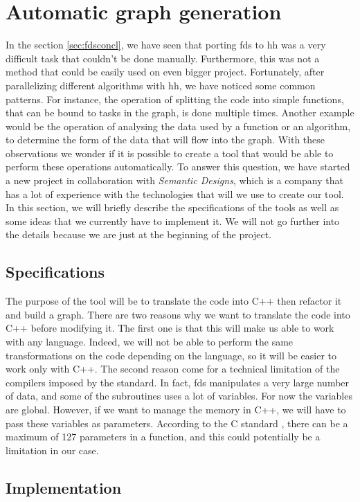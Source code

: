 
\section{Automatic graph generation}

In the section \ref{sec:fdsconcl}, we have seen that porting \gls{fds} to
\gls{hh} was a very difficult task that couldn't be done manually. Furthermore,
this was not a method that could be easily used on even bigger project.
Fortunately, after parallelizing different algorithms with \gls{hh}, we have
noticed some common patterns. For instance, the operation of splitting the code
into simple functions, that can be bound to tasks in the graph, is done multiple
times. Another example would be the operation of analysing the data used by a
function or an algorithm, to determine the form of the data that will flow into
the graph. With these observations we wonder if it is possible to create a tool
that would be able to perform these operations automatically. To answer this
question, we have started a new project in collaboration with \textit{Semantic
Designs}, which is a company that has a lot of experience with the technologies
that will we use to create our tool. In this section, we will briefly describe
the specifications of the tools as well as some ideas that we currently have to
implement it. We will not go further into the details because we are just at the
beginning of the project.

\subsection{Specifications}

The purpose of the tool will be to translate the code into C++ then refactor it
and build a graph. There are two reasons why we want to translate the code into
C++ before modifying it. The first one is that this will make us able to work
with any language. Indeed, we will not be able to perform the same transformations
on the code depending on the language, so it will be easier to work only with
C++. The second reason come for a technical limitation of the compilers imposed
by the standard. In fact, \gls{fds} manipulates a very large number of data,
and some of the subroutines uses a lot of variables. For now the variables are
global. However, if we want to manage the memory in C++, we will have to pass
these variables as parameters. According to the C standard \cite{cstd}, there
can be a maximum of 127 parameters in a function, and this could potentially be
a limitation in our case.


\subsection{Implementation}
